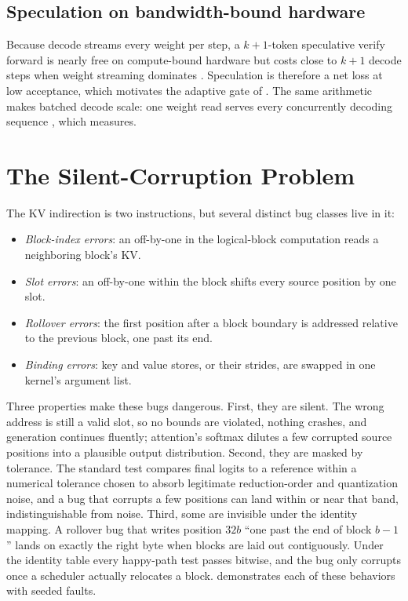 \documentclass[sigconf,nonacm,screen]{acmart}
\begin{document}
\subsection{Speculation on bandwidth-bound hardware}
Because decode streams every weight per step, a $k{+}1$-token speculative
verify forward is nearly free on compute-bound hardware but costs close to
$k{+}1$ decode steps when weight streaming dominates
\citep{leviathan2023speculative,saxena2023promptlookup}. Speculation is
therefore a net loss at low acceptance, which motivates the adaptive gate of
. The same arithmetic makes batched decode scale:
one weight read serves every concurrently decoding sequence
\citep{yu2022orca}, which  measures.

\section{The Silent-Corruption Problem}
\label{sec:silent}
The KV indirection is two instructions, but several distinct bug classes
live in it:

\begin{itemize}\itemsep2pt
  \item \emph{Block-index errors}: an off-by-one in the logical-block
  computation reads a neighboring block's KV.
  \item \emph{Slot errors}: an off-by-one within the block shifts every
  source position by one slot.
  \item \emph{Rollover errors}: the first position after a block boundary is
  addressed relative to the previous block, one past its end.
  \item \emph{Binding errors}: key and value stores, or their strides, are
  swapped in one kernel's argument list.
\end{itemize}

Three properties make these bugs dangerous. First, they are silent. The
wrong address is still a valid slot, so no bounds are violated, nothing
crashes, and generation continues fluently; attention's softmax dilutes a few
corrupted source positions into a plausible output distribution. Second,
they are masked by tolerance. The standard test compares final logits to a
reference within a numerical tolerance chosen to absorb legitimate
reduction-order and quantization noise, and a bug that corrupts a few
positions can land within or near that band, indistinguishable from noise.
Third, some are invisible under the identity mapping. A rollover bug that
writes position $32b$ ``one past the end of block $b{-}1$'' lands on exactly
the right byte when blocks are laid out contiguously. Under the identity
table every happy-path test passes bitwise, and the bug only corrupts once a
scheduler actually relocates a block.  demonstrates
each of these behaviors with seeded faults.
\end{document}
